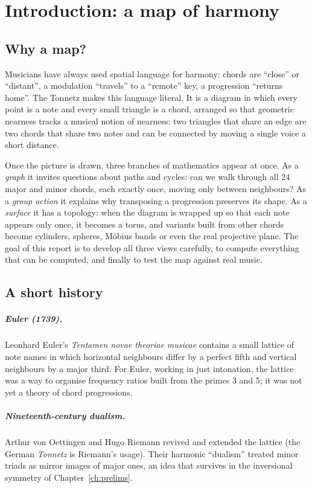 \chapter{Introduction: a map of harmony}\label{ch:intro}

\section{Why a map?}
Musicians have always used spatial language for harmony: chords are ``close'' or ``distant'', a modulation
``travels'' to a ``remote'' key, a progression ``returns home''. The Tonnetz makes this language literal. It is a
diagram in which every point is a note and every small triangle is a chord, arranged so that geometric nearness
tracks a musical notion of nearness: two triangles that share an edge are two chords that share two notes and
can be connected by moving a single voice a short distance.

Once the picture is drawn, three branches of mathematics appear at once. As a \emph{graph} it invites questions
about paths and cycles: can we walk through all 24 major and minor chords, each exactly once, moving only between
neighbours? As a \emph{group action} it explains why transposing a progression preserves its shape. As a
\emph{surface} it has a topology: when the diagram is wrapped up so that each note appears only once, it becomes a
torus, and variants built from other chords become cylinders, spheres, M\"obius bands or even the real projective
plane. The goal of this report is to develop all three views carefully, to compute everything that can be
computed, and finally to test the map against real music.

\section{A short history}
\paragraph{Euler (1739).} Leonhard Euler's \emph{Tentamen novae theoriae musicae} \citep{euler1739} contains a
small lattice of note names in which horizontal neighbours differ by a perfect fifth and vertical neighbours by a
major third. For Euler, working in just intonation, the lattice was a way to organise frequency ratios built from
the primes 3 and 5; it was not yet a theory of chord progressions.

\paragraph{Nineteenth-century dualism.} Arthur von Oettingen \citep{oettingen1866} and Hugo Riemann
\citep{riemann1893} revived and extended the lattice (the German \emph{Tonnetz} is Riemann's usage). Their
harmonic ``dualism'' treated minor triads as mirror images of major ones, an idea that survives in the
inversional symmetry of Chapter~\ref{ch:prelims}.

